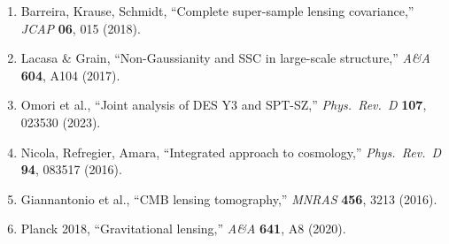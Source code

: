\documentclass[11pt,a4paper]{article}
\begin{document}
\begin{enumerate}
\item Barreira, Krause, Schmidt, ``Complete super-sample lensing covariance,'' \textit{JCAP} \textbf{06}, 015 (2018).
\item Lacasa \& Grain, ``Non-Gaussianity and SSC in large-scale structure,'' \textit{A\&A} \textbf{604}, A104 (2017).
\item Omori et al., ``Joint analysis of DES Y3 and SPT-SZ,'' \textit{Phys.\ Rev.\ D} \textbf{107}, 023530 (2023).
\item Nicola, Refregier, Amara, ``Integrated approach to cosmology,'' \textit{Phys.\ Rev.\ D} \textbf{94}, 083517 (2016).
\item Giannantonio et al., ``CMB lensing tomography,'' \textit{MNRAS} \textbf{456}, 3213 (2016).
\item Planck 2018, ``Gravitational lensing,'' \textit{A\&A} \textbf{641}, A8 (2020).
\end{enumerate}
\end{document}
